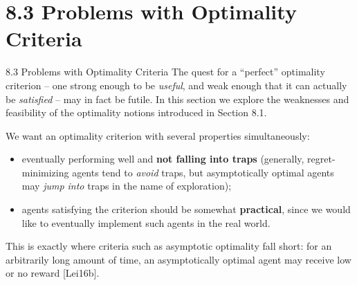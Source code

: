 \documentclass[aspectratio=169,10pt]{beamer}
\begin{document}
\section{8.3 Problems with Optimality Criteria}

\begin{frame}{8.3 Problems with Optimality Criteria}
  The quest for a ``perfect'' optimality criterion -- one strong enough to
  be \emph{useful}, and weak enough that it can actually be
  \emph{satisfied} -- may in fact be futile. In this section we explore the
  weaknesses and feasibility of the optimality notions introduced in
  Section 8.1.

  \bigskip
  We want an optimality criterion with several properties simultaneously:
  \begin{itemize}
    \item eventually performing well and \textbf{not falling into traps}
      (generally, regret-minimizing agents tend to \emph{avoid} traps, but
      asymptotically optimal agents may \emph{jump into} traps in the name
      of exploration);
    \item agents satisfying the criterion should be somewhat
      \textbf{practical}, since we would like to eventually implement such
      agents in the real world.
  \end{itemize}
  This is exactly where criteria such as asymptotic optimality fall short:
  for an arbitrarily long amount of time, an asymptotically optimal agent
  may receive low or no reward [Lei16b].
\end{frame}
\end{document}
